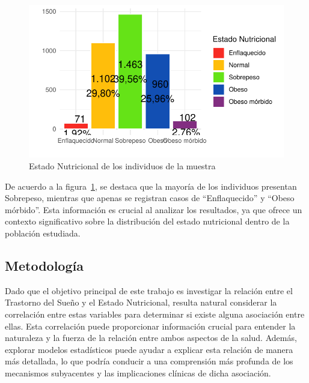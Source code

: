 \documentclass[
  10pt,
  letterpaper,
  DIV=11,
  numbers=noendperiod,
  twocolumn]{scrartcl}
\begin{document}
\begin{figure}[H]

{\centering \includegraphics{informe_estadistico_files/figure-pdf/fig-f4-1.pdf}

}

\caption{\label{fig-f4}Estado Nutricional de los individuos de la
muestra}

\end{figure}

De acuerdo a la figura~\ref{fig-f4}, se destaca que la mayoría de los
individuos presentan Sobrepeso, mientras que apenas se registran casos
de ``Enflaquecido'' y ``Obeso mórbido''. Esta información es crucial al
analizar los resultados, ya que ofrece un contexto significativo sobre
la distribución del estado nutricional dentro de la población estudiada.

\hypertarget{metodologuxeda}{%
\subsection{Metodología}\label{metodologuxeda}}

Dado que el objetivo principal de este trabajo es investigar la relación
entre el Trastorno del Sueño y el Estado Nutricional, resulta natural
considerar la correlación entre estas variables para determinar si
existe alguna asociación entre ellas. Esta correlación puede
proporcionar información crucial para entender la naturaleza y la fuerza
de la relación entre ambos aspectos de la salud. Además, explorar
modelos estadísticos puede ayudar a explicar esta relación de manera más
detallada, lo que podría conducir a una comprensión más profunda de los
mecanismos subyacentes y las implicaciones clínicas de dicha asociación.
\end{document}
